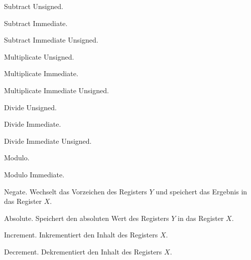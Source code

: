 

\glqq Subtract Unsigned\grqq.


\glqq Subtract Immediate\grqq.


\glqq Subtract Immediate Unsigned\grqq.






\glqq Multiplicate Unsigned\grqq.



\glqq Multiplicate Immediate\grqq.



\glqq Multiplicate Immediate Unsigned\grqq.







\glqq Divide Unsigned\grqq.



\glqq Divide Immediate\grqq.



\glqq Divide Immediate Unsigned\grqq.



Modulo.


Modulo Immediate.



\glqq Negate\grqq.
Wechselt das Vorzeichen des Registers $Y$ und speichert das Ergebnis in das 
Register $X$.



\glqq Absolute\grqq.
Speichert den absoluten Wert des Registers $Y$ in das Register $X$.


\glqq Increment\grqq.
Inkrementiert den Inhalt des Registers $X$.



\glqq Decrement\grqq.
Dekrementiert den Inhalt des Registers $X$.





